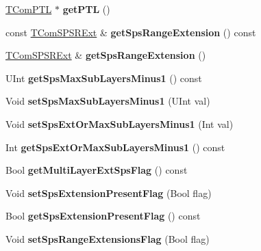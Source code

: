 \begin{DoxyCompactItemize}
\hyperlink{class_t_com_p_t_l}{T\+Com\+P\+TL} $\ast$ {\bfseries get\+P\+TL} ()
\item 
\mbox{\label{class_t_com_s_p_s_a58f2fc5b98fd162c6f0c52c6a67c70af}} 
const \hyperlink{class_t_com_s_p_s_r_ext}{T\+Com\+S\+P\+S\+R\+Ext} \& {\bfseries get\+Sps\+Range\+Extension} () const
\item 
\mbox{\label{class_t_com_s_p_s_a4c7c4d60680589e091af13f69e2f98a7}} 
\hyperlink{class_t_com_s_p_s_r_ext}{T\+Com\+S\+P\+S\+R\+Ext} \& {\bfseries get\+Sps\+Range\+Extension} ()
\item 
\mbox{\label{class_t_com_s_p_s_a55e91b9971669896fbaa00a329ab162a}} 
U\+Int {\bfseries get\+Sps\+Max\+Sub\+Layers\+Minus1} () const
\item 
\mbox{\label{class_t_com_s_p_s_a0a251c0f0afff6636d53a325ac0837b0}} 
Void {\bfseries set\+Sps\+Max\+Sub\+Layers\+Minus1} (U\+Int val)
\item 
\mbox{\label{class_t_com_s_p_s_a713dd01019d3fe4520cb35a9d6e20747}} 
Void {\bfseries set\+Sps\+Ext\+Or\+Max\+Sub\+Layers\+Minus1} (Int val)
\item 
\mbox{\label{class_t_com_s_p_s_a3d56c775efddb0772e2daf6158ab09ba}} 
Int {\bfseries get\+Sps\+Ext\+Or\+Max\+Sub\+Layers\+Minus1} () const
\item 
\mbox{\label{class_t_com_s_p_s_aff6876034410c545f665828cc6e6aa2a}} 
Bool {\bfseries get\+Multi\+Layer\+Ext\+Sps\+Flag} () const
\item 
\mbox{\label{class_t_com_s_p_s_a38892cf0693d2e814346fcd7a6f75f17}} 
Void {\bfseries set\+Sps\+Extension\+Present\+Flag} (Bool flag)
\item 
\mbox{\label{class_t_com_s_p_s_a11572c083254743d6db2c74ab10e531b}} 
Bool {\bfseries get\+Sps\+Extension\+Present\+Flag} () const
\item 
\mbox{\label{class_t_com_s_p_s_a30077c7cc39a413792aea30545be8f99}} 
Void {\bfseries set\+Sps\+Range\+Extensions\+Flag} (Bool flag)

\end{DoxyCompactItemize}

